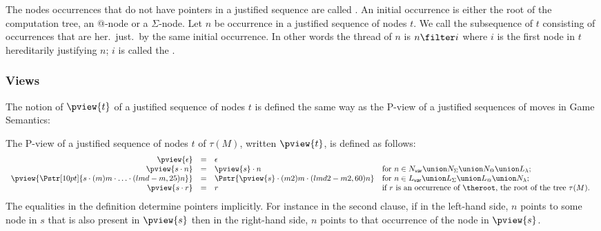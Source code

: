 The nodes occurrences that do not have pointers in a justified
sequence are called . An initial
occurrence is either the root of the computation tree,
an @-node or a $\Sigma$-node. Let $n$ be occurrence in a justified
sequence of nodes $t$. We call
 the subsequence of $t$
consisting of occurrences that are her.\ just.\ by the same initial
occurrence. In other words the thread of $n$ is $n \filter i$ where
$i$ is the first node in $t$ hereditarily justifying $n$; $i$ is
called the .

\subsubsection{Views}
The notion of  $\pview{t}$ of a justified sequence
of nodes $t$ is defined the same way as the P-view of a justified
sequences of moves in Game Semantics:

\begin{definition}
The P-view of a justified sequence of nodes $t$ of $\tau(M)$, written $\pview{t}$, is defined as follows:
$$\begin{array}{rcll}
 \pview{\epsilon} &=&  \epsilon \\
 \pview{s \cdot n }  &=&  \pview{s} \cdot n
    & \mbox{for $n \in N_{\sf var} \union N_\Sigma \union N_@ \union L_\lambda$;}
    \\
 \pview{\Pstr[10pt]{ s \cdot (m){m} \cdot \ldots \cdot (lmd-m,25){n}}} &=&
        \Pstr{ \pview{s} \cdot (m2){m} \cdot (lmd2-m2,60){n} }
    & \mbox{for $n \in L_{\sf var} \union L_\Sigma \union L_@ \union N_\lambda$;}
    \\
 \pview{s \cdot r }  &=&  r
    & \mbox{if $r$ is an occurrence of $\theroot$, the root of the tree $\tau(M)$. }
\end{array}$$
The equalities in the definition determine pointers implicitly. For
instance in the second clause, if in the left-hand side, $n$ points
to some node in $s$  that is also present in $\pview{s}$ then in the
right-hand side, $n$ points to that occurrence of the node in
$\pview{s}$.
\end{definition}


